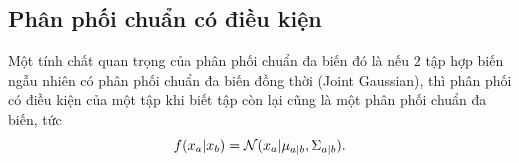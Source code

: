 \subsection{Phân phối chuẩn có điều kiện}
Một tính chất quan trọng của phân phối chuẩn đa biến đó là nếu $2$ tập hợp biến ngẫu nhiên có phân phối chuẩn đa biến đồng thời (Joint Gaussian), thì phân phối có điều kiện của một tập khi biết tập còn lại cũng là một phân phối chuẩn đa biến, tức 
\[
    f(x_a | x_b) = \mathcal{N}(x_a | \mu_{a|b}, \Sigma_{a|b}).
\]

